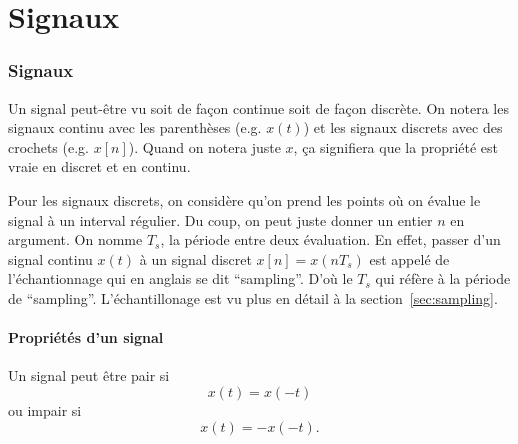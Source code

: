 

\newcommand{\fourier}{\mathcal{F}}
\newcommand{\laplace}{\mathcal{L}}
\newcommand{\laplacu}{\mathcal{F}_u}
\newcommand{\transfz}{\mathcal{Z}}
\newcommand{\transzu}{\mathcal{Z}_u}
\newcommand{\roc}{\mathrm{ROC}}




\part{Signaux}
\section{Signaux}
Un signal peut-être vu soit de façon continue soit de façon discrète.
On notera les signaux continu avec les parenthèses (e.g. $x(t)$)
et les signaux discrets avec des crochets (e.g. $x[n]$).
Quand on notera juste $x$, ça signifiera que la propriété est vraie
en discret et en continu.

Pour les signaux discrets, on considère qu'on prend les points où on
évalue le signal à un interval régulier.
Du coup, on peut juste donner un entier $n$ en argument.
On nomme $T_s$, la période entre deux évaluation.
En effet, passer d'un signal continu $x(t)$ à un signal discret
$x[n] = x(nT_s)$ est appelé de l'échantionnage qui en anglais se dit
``sampling''. D'où le $T_s$ qui réfère à la période de ``sampling''.
L'échantillonage est vu plus en détail à la section~\ref{sec:sampling}.

\subsection{Propriétés d'un signal}
Un signal peut être pair si
\[ x(t) = x(-t) \]
ou impair si
\[ x(t) = -x(-t). \]

